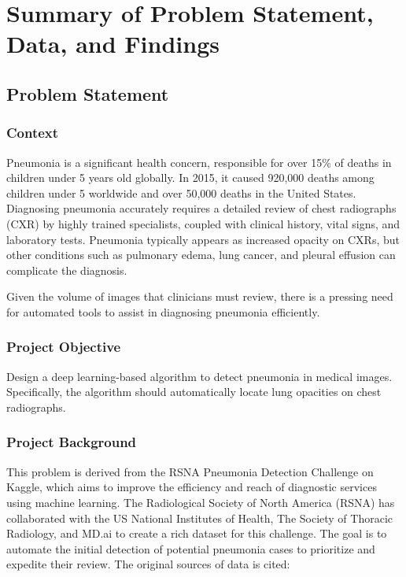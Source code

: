 \chapter{Summary of Problem Statement, Data, and Findings}
\label{cha:chapter 1}


\section{Problem Statement}
\label{sec:chap1 section 1}

\subsection{Context}
\label{subsec:chap1 section 1.1}
Pneumonia is a significant health concern, responsible for over 15\% of deaths in children under 5 years old globally. In 2015, it caused 920,000 deaths among children under 5 worldwide and over 50,000 deaths in the United States. Diagnosing pneumonia accurately requires a detailed review of chest radiographs (CXR) by highly trained specialists, coupled with clinical history, vital signs, and laboratory tests. Pneumonia typically appears as increased opacity on CXRs, but other conditions such as pulmonary edema, lung cancer, and pleural effusion can complicate the diagnosis.

Given the volume of images that clinicians must review, there is a pressing need for automated tools to assist in diagnosing pneumonia efficiently.

\subsection{Project Objective}
\label{subsec:chap1 section 1.2}

Design a deep learning-based algorithm to detect pneumonia in medical images. Specifically, the algorithm should automatically locate lung opacities on chest radiographs.

\subsection{Project Background}
\label{subsec:chap1 section 1.3}
This problem is derived from the RSNA Pneumonia Detection Challenge on Kaggle, which aims to improve the efficiency and reach of diagnostic services using machine learning. The Radiological Society of North America (RSNA) has collaborated with the US National Institutes of Health, The Society of Thoracic Radiology, and MD.ai to create a rich dataset for this challenge. The goal is to automate the initial detection of potential pneumonia cases to prioritize and expedite their review. The original sources of data is cited: ~\cite{rui2015emergency, cdc2015deaths, franquet2018pneumonia, kelly2012chest, wang2017chestxray8}

